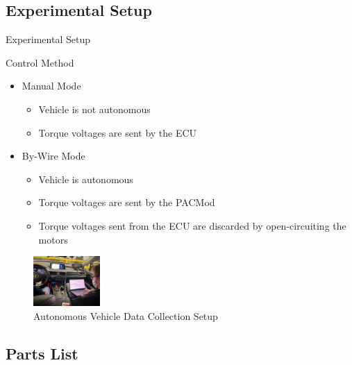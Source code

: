 \documentclass{beamer}
\begin{document}
\subsection{Experimental Setup}

\begin{frame}{Experimental Setup}
	\begin{block}{Control Method}
		\begin{itemize}
			\item Manual Mode
			\begin{itemize}
				\item Vehicle is not autonomous
				\item Torque voltages are sent by the ECU
			\end{itemize}
			\item By-Wire Mode
			\begin{itemize}
				\item Vehicle is autonomous
				\item Torque voltages are sent by the PACMod
				\item Torque voltages sent from the ECU are discarded by open-circuiting the motors
			\end{itemize}
		\end{itemize}
		\begin{figure}
			\centering
    			\captionsetup{justification=centering, margin=3cm}
    			\includegraphics[width=1in]{figs/img/picturesVisitToAStuff/dataColletionSetup1-20211007}
    			\caption{Autonomous Vehicle Data Collection Setup}
    			\label{fig:vehicleSetup}
		\end{figure}
	\end{block}
\end{frame}

\subsection{Parts List}
\end{document}
